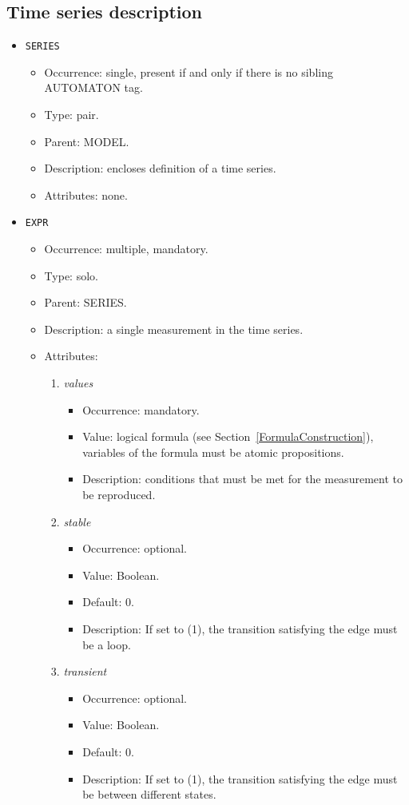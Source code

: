\documentclass[12pt]{article}
\newenvironment{menum}{
\begin{enumerate}
  \setlength{\itemsep}{0pt}
  \setlength{\parskip}{0pt}
  \setlength{\parsep}{0pt}
}{\end{enumerate}}
\newenvironment{mitem}{
\begin{itemize}
  \setlength{\itemsep}{0pt}
  \setlength{\parskip}{0pt}
  \setlength{\parsep}{0pt}
}{\end{itemize}}
\begin{document}
\subsection{Time series description}
\begin{mitem}
	\item \texttt{SERIES}
	\begin{mitem}
		\item Occurrence: single,  present if and only if there is no sibling AUTOMATON tag.
		\item Type: pair.
		\item Parent: MODEL.
		\item Description: encloses definition of a time series.
		\item Attributes: none.
	\end{mitem}
\end{mitem}				
	
\begin{mitem}
	\item \texttt{EXPR}
	\begin{mitem}
		\item Occurrence: multiple, mandatory.
		\item Type: solo.
		\item Parent: SERIES.
		\item Description: a single measurement in the time series.
		\item Attributes:	
		\begin{menum}
			\item \textit{values} 
			\begin{mitem}
				\item Occurrence: mandatory.
				\item Value: logical formula (see Section~\ref{FormulaConstruction}), variables of the formula must be atomic propositions.
				\item Description: conditions that must be met for the measurement to be reproduced.
			\end{mitem}
						\item \textit{stable} 
			\begin{mitem}
				\item Occurrence: optional.
				\item Value: Boolean.
				\item Default: 0.
				\item Description: If set to (1), the transition satisfying the edge must be a loop.
			\end{mitem}
			\item \textit{transient} 
			\begin{mitem}
				\item Occurrence: optional.
				\item Value: Boolean.
				\item Default: 0.
				\item Description: If set to (1), the transition satisfying the edge must be between different states.
			\end{mitem}
		\end{menum}
	\end{mitem}
\end{mitem}	
\end{document}
